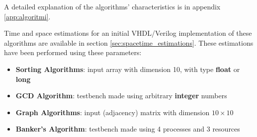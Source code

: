 A detailed explanation of the algorithms' characteristics is in appendix \ref{app:algoritmi}.

Time and space estimations for an initial VHDL/Verilog implementation of these algorithms are available in section \ref{sec:spacetime_estimations}. These estimations have been performed using these parameters:
\begin{itemize}[noitemsep]
	\item \textbf{Sorting Algorithms}: input array with dimension 10, with type \textbf{float} or \textbf{long}
	\item \textbf{GCD Algorithm}: testbench made using arbitrary \textbf{integer} numbers
	\item \textbf{Graph Algorithms}: input (adjacency) matrix with dimension $10\times10$
	\item \textbf{Banker's Algorithm}: testbench made using 4 processes and 3 resources

\end{itemize}